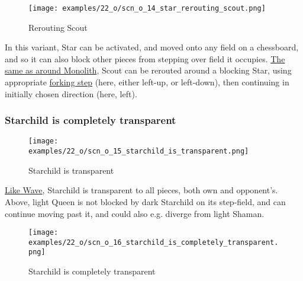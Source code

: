 \noindent
\begin{wrapfigure}[8]{l}{0.4\textwidth}
\centering
\texttt{[image: examples/22\_o/scn\_o\_14\_star\_rerouting\_scout.png]}
\caption{Rerouting Scout}
\label{fig:scn_o_14_star_rerouting_scout}
\end{wrapfigure}
In this variant, Star can be activated, and moved onto any field on a chessboard,
and so it can also block other pieces from stepping over field it occupies. \newline
\indent
\hyperref[fig:scn_d_10_monolith_rerouting_scout]{The same as around Monolith},
Scout can be rerouted around a blocking Star, using appropriate
\hyperref[fig:scn_hd_17_scout_forking_steps]{forking step} (here, either left-up,
or left-down), then continuing in initially chosen direction (here, left).

\clearpage %

\subsubsection*{Starchild is completely transparent}
\label{sec:One/Starchild/Divergence/Starchild is completely transparent}

\vspace*{-1.4\baselineskip}
\noindent
\begin{figure}[!h]
\texttt{[image: examples/22\_o/scn\_o\_15\_starchild\_is\_transparent.png]}
\vspace*{-1.3\baselineskip}
\caption{Starchild is transparent}
\label{fig:scn_o_15_starchild_is_transparent}
\end{figure}

\vspace*{-0.4\baselineskip}
\hyperref[fig:scn_mv_07_wave_is_transparent]{Like Wave}, Starchild is transparent
to all pieces, both own and opponent's. Above, light Queen is not blocked by dark
Starchild on its step-field, and can continue moving past it, and could also e.g.
diverge from light Shaman.

\vspace*{-0.7\baselineskip}
\noindent
\begin{figure}[!h]
\texttt{[image: examples/22\_o/scn\_o\_16\_starchild\_is\_completely\_transparent.png]}
\vspace*{-1.3\baselineskip}
\caption{Starchild is completely transparent}
\label{fig:scn_o_16_starchild_is_completely_transparent}
\end{figure}

